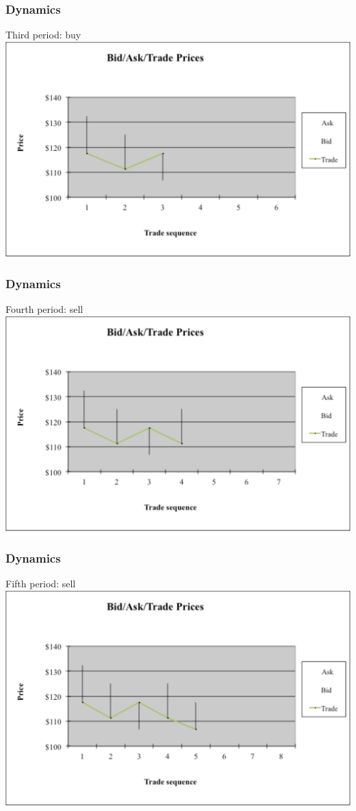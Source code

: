 \documentclass[english,10pt]{beamer}
\begin{document}
\begin{frame} [noframenumbering]
	\frametitle{Dynamics}
	Third period: buy
	\center
	\includegraphics[width=0.9\linewidth]{pics/P3_Image.pdf}
\end{frame}


\begin{frame} [noframenumbering]
	\frametitle{Dynamics}
	Fourth period: sell
	\center
	\includegraphics[width=0.9\linewidth]{pics/P4_Image.pdf}
\end{frame}


\begin{frame} [noframenumbering]
	\frametitle{Dynamics}
	Fifth period: sell
	\center
	\includegraphics[width=0.9\linewidth]{pics/P5_Image.pdf}
\end{frame}
\end{document}
